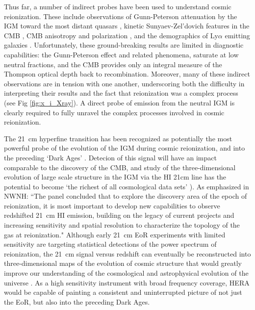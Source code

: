 \documentclass[preprint]{aastex}
\begin{document}
Thus far, a number of indirect probes have been used to understand cosmic
reionization.  These include observations of Gunn-Peterson attenuation by the
IGM toward the most distant quasars \citep{fan_et_al2006,bouwens_et_al2010},
kinetic Sunyaev-Zel'dovich features in the CMB \citep{zahn_et_al2012}, CMB
anisotropy and polarization \citep{page_et_al2007,planck_et_al2013}, and the
demographics of Ly$\alpha$ emitting galaxies
\citep{treu_et_al2013}.  Unfortunately,
these ground-breaking results are limited in diagnostic capabilities: the
Gunn-Peterson effect and related phenomena, saturate at low neutral fractions,
and the CMB provides only an integral measure of the Thompson optical depth
back to recombination.  Moreover, many of these indirect observations are in
tension with one another, underscoring both the difficulty in interpreting
their results and the fact that reionization was a complex process (see Fig \ref{fig:x_i_Xray}).
A direct probe of emission from the neutral IGM is clearly required to fully
unravel the complex processes involved in cosmic reionization. 

The 21~cm hyperfine transition has been recognized as potentially the most
powerful probe of the evolution of the IGM during cosmic reionization, and into
the preceding `Dark Ages' \citep{morales_wyithe2010,furlanetto_et_al2006}.
Detecion of this signal will have an impact
comparable to the discovery of the CMB, and study of the three-dimensional
evolution of large scale structure in the IGM via the HI 21cm line has the
potential to become `the richest of all cosmological data sets'
\citep{barkana_loeb2005a,loeb_zaldarriaga2004}).  As emphasized in
NWNH: ``The panel concluded that to explore the discovery
area of the epoch of reionization, it is most important to develop new
capabilities to observe redshifted 21~cm HI emission, building on the legacy of
current projects and increasing sensitivity and spatial resolution to
characterize the topology of the gas at reionization."  Although early 21~cm
EoR experiments with limited sensitivity are targeting statistical detections
of the power spectrum of reionization, the 21~cm signal versus redshift can
eventually be reconstructed into three-dimensional maps of the evolution of
cosmic structure that would greatly improve our understanding of the
cosmological and astrophysical evolution of the universe
\citep{furlanetto_et_al2006,mao_et_al2008,morales_wyithe2010}. As a high
sensitivity instrument with broad frequency coverage, HERA would be capable of
painting a consistent and uninterrupted picture of not just the EoR, but also
into the preceding Dark Ages.  
\end{document}
